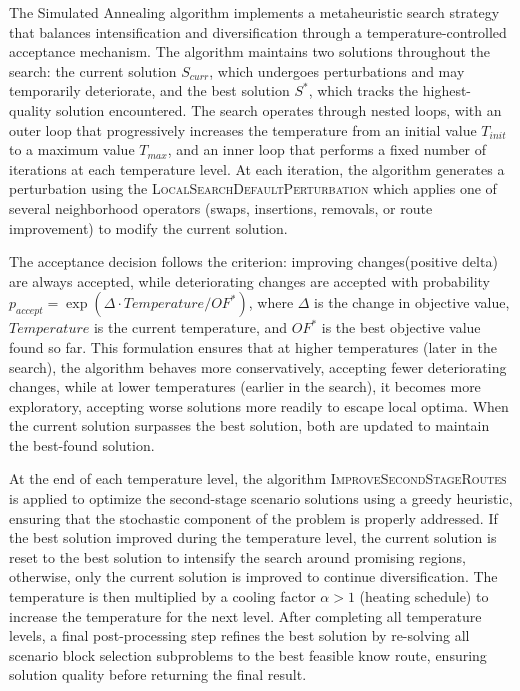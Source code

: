 The Simulated Annealing algorithm implements a metaheuristic search strategy that balances intensification and diversification through a temperature-controlled acceptance mechanism. The algorithm maintains two solutions throughout the search: the current solution $S_{curr}$, which undergoes perturbations and may temporarily deteriorate, and the best solution $S^*$, which tracks the highest-quality solution encountered. The search operates through nested loops, with an outer loop that progressively increases the temperature from an initial value $T_{init}$ to a maximum value $T_{max}$, and an inner loop that performs a fixed number of iterations at each temperature level. At each iteration, the algorithm generates a perturbation using the \textsc{LocalSearchDefaultPerturbation} which applies one of several neighborhood operators (swaps, insertions, removals, or route improvement) to modify the current solution.

The acceptance decision follows the criterion: improving changes(positive delta) are always accepted, while deteriorating changes are accepted with probability $p_{accept} = \exp(\Delta \cdot Temperature / OF^*)$, where $\Delta$ is the change in objective value, $Temperature$ is the current temperature, and $OF^*$ is the best objective value found so far. This formulation ensures that at higher temperatures (later in the search), the algorithm behaves more conservatively, accepting fewer deteriorating changes, while at lower temperatures (earlier in the search), it becomes more exploratory, accepting worse solutions more readily to escape local optima.
When the current solution surpasses the best solution, both are updated to maintain the best-found solution.

At the end of each temperature level, the algorithm \textsc{ImproveSecondStageRoutes} is applied to optimize the second-stage scenario solutions using a greedy heuristic, ensuring that the stochastic component of the problem is properly addressed. If the best solution improved during the temperature level, the current solution is reset to the best solution to intensify the search around promising regions, otherwise, only the current solution is improved to continue diversification. The temperature is then multiplied by a cooling factor $\alpha > 1$ (heating schedule) to increase the temperature for the next level. After completing all temperature levels, a final post-processing step refines the best solution by re-solving all scenario block selection subproblems to the best feasible know route, ensuring solution quality before returning the final result.

